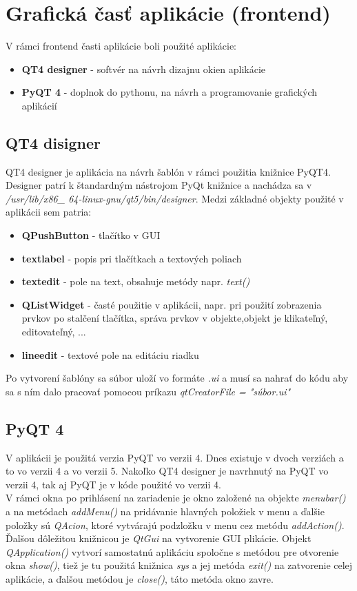 \chapter{Grafická časť aplikácie (frontend)}
V rámci frontend časti aplikácie boli použité aplikácie:\begin{itemize}
\item \textbf{QT4 designer} - softvér na návrh dizajnu okien aplikácie
\item \textbf{PyQT 4} - doplnok do pythonu, na návrh a programovanie grafických aplikácií
\end{itemize} 
\section{QT4 disigner}
QT4 designer je aplikácia na návrh šablón v rámci použitia knižnice PyQT4. Designer patrí k štandardným nástrojom PyQt knižnice a nachádza sa v \textit{/usr/lib/x86\_ 64-linux-gnu/qt5/bin/designer}. Medzi základné objekty použité v aplikácii sem patria:
\begin{itemize}
\item \textbf{QPushButton} - tlačítko v GUI
\item \textbf{textlabel} - popis pri tlačítkach a textových poliach
\item \textbf{textedit} - pole na text, obsahuje metódy napr. \textit{text()}
\item \textbf{QListWidget} - časté použitie v aplikácii, napr. pri použití zobrazenia prvkov po stalčení tlačítka, správa prvkov v objekte,objekt je klikateľný, editovateľný, ...
\item \textbf{lineedit} - textové pole na editáciu riadku
\end{itemize} 
Po vytvorení šablóny sa súbor uloží vo formáte \textit{.ui} a musí sa nahrať do kódu aby sa s ním dalo pracovať pomocou príkazu \textit{qtCreatorFile = "súbor.ui"}
\section{PyQT 4}
V aplikácii je použitá verzia PyQT vo verzii 4. Dnes existuje v dvoch verziách a to vo verzii 4 a vo verzii 5. Nakoľko QT4 designer je navrhnutý na PyQT vo verzii 4, tak aj PyQT je v kóde použité vo verzii 4. \\
V rámci okna po prihlásení na zariadenie je okno založené na objekte \textit{menubar()} a na metódach \textit{addMenu()} na pridávanie hlavných položiek v menu a ďalšie položky sú \textit{QAcion}, ktoré vytvárajú podzložku v menu cez metódu \textit{addAction()}. Ďalšou dôležitou knižnicou je \textit{QtGui} na vytvorenie GUI plikácie. Objekt \textit{QApplication()} vytvorí samostatnú aplikáciu spoločne s metódou pre otvorenie okna \textit{show()}, tiež je tu použitá knižnica \textit{sys} a jej metóda \textit{exit()} na zatvorenie celej aplikácie,  a ďalšou metódou je \textit{close()}, táto metóda okno zavre.
